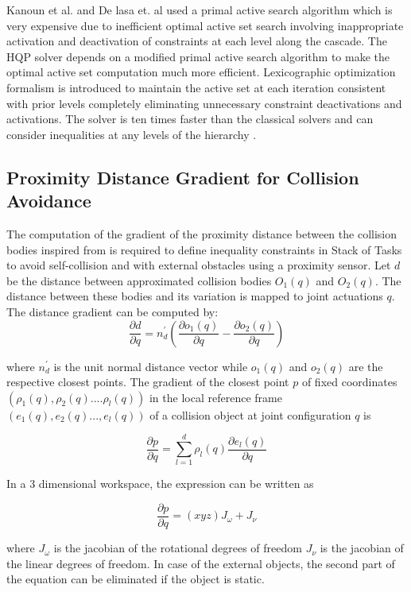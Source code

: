 Kanoun et al. and De lasa et. al used a primal active search algorithm which is very expensive due to inefficient optimal active set search involving inappropriate activation and deactivation of constraints at each level along the cascade\cite{de2010feature}\cite{kanoun2011kinematic}. The HQP solver depends on a modified primal active search algorithm to make the optimal active set computation much more efficient. Lexicographic optimization formalism is introduced to maintain the active set at each iteration consistent with prior levels completely eliminating unnecessary constraint deactivations and activations. The solver is ten times faster than the classical solvers and can consider inequalities at any levels of the
hierarchy \cite{escande2014hierarchical}.
\subsection{Proximity Distance Gradient for Collision Avoidance}
The computation of the gradient of the proximity distance between the collision bodies inspired from \cite{lefebvre2005fast} is required to define inequality constraints in Stack of Tasks to avoid self-collision and with external obstacles using a proximity sensor. Let $d$ be the distance between approximated collision bodies $O_1(q)$ and $O_2(q)$. The distance between these bodies and its variation is mapped to joint actuations $q$. The distance gradient can be computed by:
\[ \frac{\partial d}{\partial q} = n_d^{'}(\frac{\partial o_1(q)}{\partial q}- \frac{\partial o_2(q)}{\partial q}) \]

where $n_d^{'}$ is the unit normal distance vector while $o_1(q)$ and $o_2(q)$ are the respective closest points. The gradient of the closest point $p$ of fixed coordinates $(\rho_1(q),\rho_2(q)....\rho_l(q))$ in the local reference frame $(e_1(q),e_2(q)...,e_l(q))$ of a collision object at joint configuration $q$ is

\[\frac{\partial p}{\partial q} =  \sum_{l=1}^{d}\rho_l(q)\frac{\partial e_l(q) }{\partial q}\]

In a 3 dimensional workspace, the expression can be written as 

\[ \frac{\partial p}{\partial q} =  (x y  z)J_\omega + J_\nu \]

where $J_\omega$ is the jacobian of the rotational degrees of freedom $J_\nu$ is the jacobian of the linear degrees of freedom. In case of the external objects, the second part of the equation can be eliminated if the object is static. 

